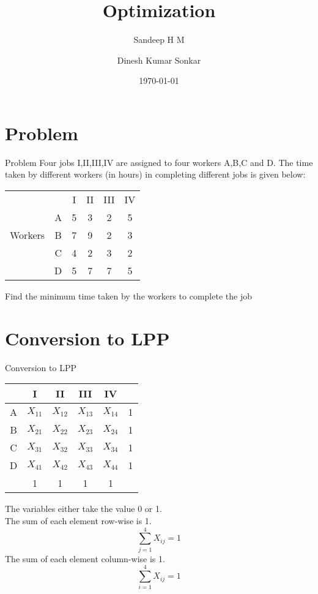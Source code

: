 \documentclass{beamer}
\title{Optimization}
\author{Sandeep H M \and Dinesh Kumar Sonkar}
\date{\today}
\begin{document}
\begin{frame}
  \titlepage
\end{frame}

\section{Problem}
\begin{frame}{Problem}
Four jobs I,II,III,IV are assigned to four workers A,B,C and D. The time taken by different workers (in hours) in completing different jobs is given below:
\begin{table}[!h]
\begin{center}
\begin{tabular}{c c c c c c}
& & I & II & III & IV \\
& A & 5 & 3 & 2 & 5 \\
Workers & B & 7 & 9 & 2 & 3 \\
& C & 4 & 2 & 3 & 2 \\
& D & 5 & 7 & 7 & 5  
\end{tabular}
\end{center}
\end{table}
Find the minimum time taken by the workers to complete the job
\end{frame}

\section{Conversion to LPP}

\begin{frame}{Conversion to LPP}

\begin{table}[!h]
\begin{center}
\begin{tabular}{c | c c c c | c}
  & I & II & III & IV & \\
  \hline
A & $X_{11}$ & $X_{12}$ & $X_{13}$ & $X_{14}$ & 1\\
B & $X_{21}$ & $X_{22}$ & $X_{23}$ & $X_{24}$ & 1\\
C & $X_{31}$ & $X_{32}$ & $X_{33}$ & $X_{34}$ & 1\\
D & $X_{41}$ & $X_{42}$ & $X_{43}$ & $X_{44}$ & 1 \\
\hline
  & 1 & 1 & 1 & 1 &
\end{tabular}
\end{center}
\end{table} 
The variables either take the value 0 or 1.\\
The sum of each element row-wise is 1.
\begin{equation*}
\sum_{j=1}^{4} X_{ij}  = 1 
\end{equation*}
The sum of each element column-wise is 1.
\begin{equation*}
\sum_{i=1}^{4} X_{ij}  = 1 
\end{equation*}


\end{frame}
\end{document}
